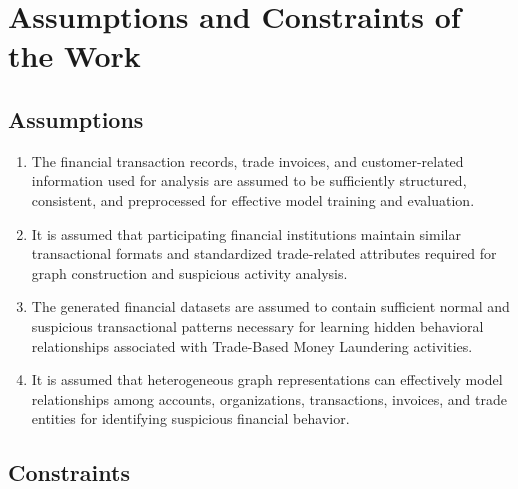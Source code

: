 \section[Assumptions and Constraints of the Work]{\textbf{Assumptions and Constraints of the Work}}

\subsection{Assumptions}

{\renewcommand{\theenumi}{\roman{enumi}}\renewcommand{\labelenumi}{(\theenumi)}%
\begin{enumerate}
    \item The financial transaction records, trade invoices, and customer-related information used for analysis are assumed to be sufficiently structured, consistent, and preprocessed for effective model training and evaluation.

    \item It is assumed that participating financial institutions maintain similar transactional formats and standardized trade-related attributes required for graph construction and suspicious activity analysis.

    \item The generated financial datasets are assumed to contain sufficient normal and suspicious transactional patterns necessary for learning hidden behavioral relationships associated with Trade-Based Money Laundering activities.

    \item It is assumed that heterogeneous graph representations can effectively model relationships among accounts, organizations, transactions, invoices, and trade entities for identifying suspicious financial behavior.
\end{enumerate}}

\subsection{Constraints}

